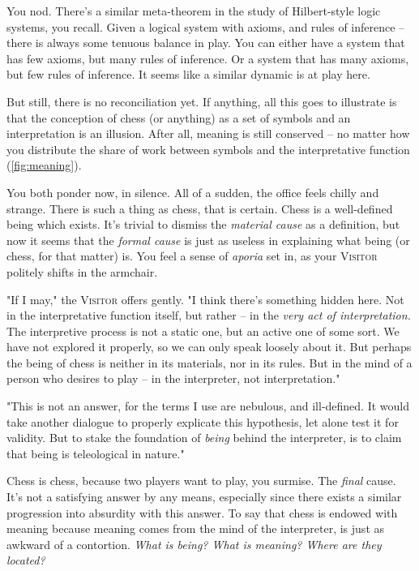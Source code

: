 You nod. There's a similar meta-theorem in the study of Hilbert-style logic systems, you recall. Given a logical system with axioms, and rules of inference -- there is always some tenuous balance in play. You can either have a system that has few axioms, but many rules of inference. Or a system that has many axioms, but few rules of inference. It seems like a similar dynamic is at play here.

But still, there is no reconciliation yet. If anything, all this goes to illustrate is that the conception of chess (or anything) as a set of symbols and an interpretation is an illusion. After all, meaning is still conserved -- no matter how you distribute the share of work between symbols and the interpretative function (\autoref{fig:meaning}).

You both ponder now, in silence. All of a sudden, the office feels chilly and strange. There is such a thing as chess, that is certain. Chess is a well-defined being which exists. It's trivial to dismiss the \emph{material cause} as a definition, but now it seems that the \emph{formal cause} is just as useless in explaining what being (or chess, for that matter) is. You feel a sense of \emph{aporia} set in, as your \textsc{Visitor} politely shifts in the armchair.

"If I may," the \textsc{Visitor} offers gently. "I think there's something hidden here. Not in the interpretative function itself, but rather -- in the \emph{very act of interpretation.} The interpretive process is not a static one, but an active one of some sort. We have not explored it properly, so we can only speak loosely about it. But perhaps the being of chess is neither in its materials, nor in its rules. But in the mind of a person who desires to play -- in the interpreter, not interpretation."

"This is not an answer, for the terms I use are nebulous, and ill-defined. It would take another dialogue to properly explicate this hypothesis, let alone test it for validity. But to stake the foundation of \emph{being} behind the interpreter, is to claim that being is teleological in nature."

Chess is chess, because two players want to play, you surmise. The \emph{final} cause. It's not a satisfying answer by any means, especially since there exists a similar progression into absurdity with this answer. To say that chess is endowed with meaning because meaning comes from the mind of the interpreter, is just as awkward of a contortion. \emph{What is being? What is meaning? Where are they located?}

